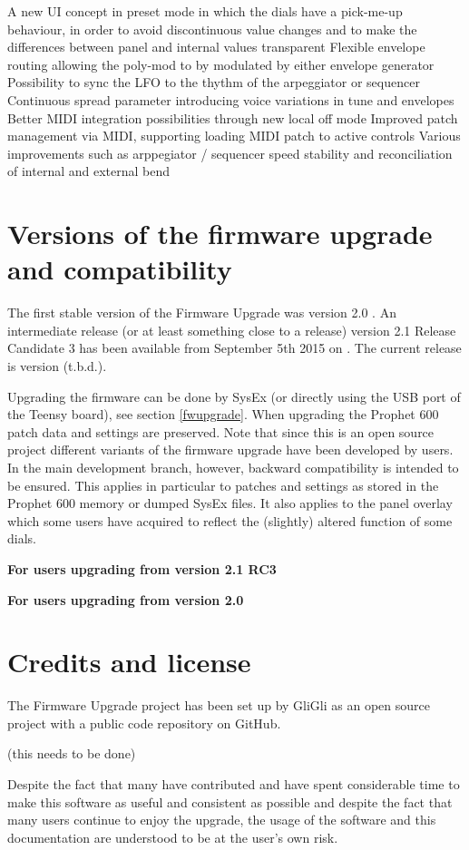 \documentclass[draft,landscape, 11pt, oneside]{report}
\newenvironment{flowtext}{\addmargin[0cm]{7cm}}{\endaddmargin} %
\begin{document}
\begin{flowtext}
\begin{itemize}
  \subitem A new UI concept in preset mode in which the dials have a pick-me-up behaviour, in order to avoid discontinuous value changes and to make the differences between panel and internal values transparent 
  \subitem Flexible envelope routing allowing the poly-mod to by modulated by either envelope generator
  \subitem Possibility to sync the LFO to the thythm of the arpeggiator or sequencer
  \subitem Continuous spread parameter introducing voice variations in tune and envelopes
  \subitem Better MIDI integration possibilities through new local off mode
  \subitem Improved patch management via MIDI, supporting loading MIDI patch to active controls 
  \subitem Various improvements such as arppegiator / sequencer speed stability and reconciliation of internal and external bend  
  
\end{itemize}

\section{Versions of the firmware upgrade and compatibility}

The first stable version of the Firmware Upgrade was version 2.0 \cite{versiontwo}. An intermediate release (or at least something close to a release) version 2.1 Release Candidate 3 has been available from September 5th 2015 on \cite{gligli}. The current release is version (t.b.d.). 

Upgrading the firmware can be done by SysEx (or directly using the USB port of the Teensy board), see section \ref{fwupgrade}. When upgrading the Prophet 600 patch data and settings are preserved. Note that since this is an open source project different variants of the firmware upgrade have been developed by users. In the main development branch, however, backward compatibility is intended to be ensured. This applies in particular to patches and settings as stored in the Prophet 600 memory or dumped SysEx files. It also applies to the panel overlay which some users have acquired to reflect the (slightly) altered function of some dials. 

\textbf{For users upgrading from version 2.1 RC3}

\textbf{For users upgrading from version 2.0}

\section{Credits and license}

The Firmware Upgrade project has been set up by GliGli as an open source project with a public code repository on GitHub\cite{repository}. 

(this needs to be done)

Despite the fact that many have contributed and have spent considerable time to make this software as useful and consistent as possible and despite the fact that many users continue to enjoy the upgrade, the usage of the software and this documentation are understood to be at the user's own risk.


\end{flowtext}
\end{document}
